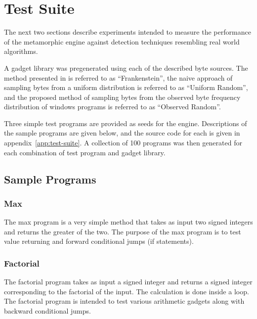 \section{Test Suite}

    The next two sections describe experiments intended to measure the
    performance of the metamorphic engine against detection techniques
    resembling real world algorithms.

    A gadget library was pregenerated using each of the described byte
    sources.  The method presented in \cite{franken} is referred to as
    ``Frankenstein'', the naive approach of sampling bytes from a uniform
    distribution is referred to as ``Uniform Random'', and the proposed
    method of sampling bytes from the observed byte frequency distribution
    of windows programs is referred to as ``Observed Random''.

    Three simple test programs are provided as seeds for the engine.
    Descriptions of the sample programs are given below, and the source code
    for each is given in appendix~\ref{app:test-suite}. A
    collection of 100 programs was then generated for each combination of
    test program and gadget library.
    
    \subsection{Sample Programs}

        \subsubsection{Max}

            The max program is a very simple method that takes as input two
            signed integers and returns the greater of the two. The purpose
            of the max program is to test value returning and forward
            conditional jumps (if statements).

        \subsubsection{Factorial}

            The factorial program takes as input a signed integer and
            returns a signed integer corresponding to the factorial of the
            input. The calculation is done inside a loop. The factorial
            program is intended to test various arithmetic gadgets along
            with backward conditional jumps.

